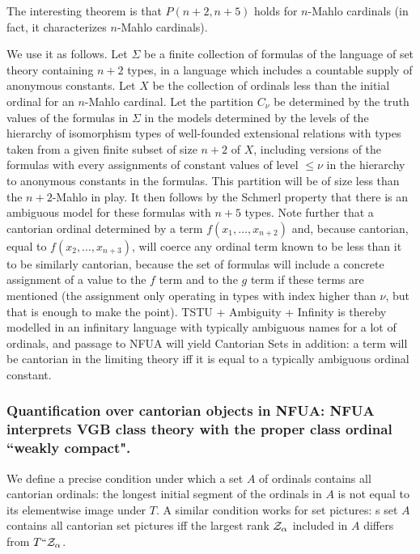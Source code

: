 \documentclass[12pt]{article}
\begin{document}
The interesting theorem is that $P(n+2,n+5)$ holds for $n$-Mahlo cardinals (in fact, it characterizes $n$-Mahlo cardinals).

We use it as follows.  Let $\Sigma$ be a finite collection of formulas of the language of set theory containing $n+2$ types, in a language which includes a countable supply of anonymous constants.  Let $X$ be the collection of ordinals less than the initial ordinal
for an $n$-Mahlo cardinal.  Let the partition $C_\nu$ be determined by the truth values of the formulas in $\Sigma$  in the models determined by the levels of the hierarchy of isomorphism types of well-founded extensional relations
with types taken from a given finite subset of size $n+2$ of $X$, including  versions of the formulas with every assignments of  constant values of level $\leq \nu$ in the hierarchy to anonymous constants in the formulas. This partition will be of size less than the $n+2$-Mahlo in play.  It then follows by the
Schmerl property that there is an ambiguous model for these formulas with $n+5$ types.  Note further that a cantorian ordinal determined by a term $f(x_1,\ldots,x_{n+2})$ and, because cantorian, equal to $f(x_2,\ldots,x_{n+3})$, will coerce any
ordinal term known to be less than it to be similarly cantorian, because the set of formulas will  include a concrete assignment of a value to the $f$ term and to the $g$ term if these terms are mentioned (the assignment only operating in types with index higher than $\nu$, but that is enough to make the point).  TSTU + Ambiguity + Infinity  is thereby modelled in an infinitary language with typically ambiguous names for a lot of ordinals, and passage to NFUA will yield Cantorian Sets in addition:  a term will be cantorian in the limiting theory iff it is equal to a typically ambiguous ordinal constant.

\subsubsection{Quantification over cantorian objects in NFUA:  NFUA interprets VGB class theory with the proper class ordinal ``weakly compact".}

We define a precise condition under which a set $A$ of ordinals contains all cantorian ordinals:  the longest initial segment of the ordinals in $A$ is not equal to its elementwise image under $T$.  A similar condition works for set pictures:  s set $A$ contains all cantorian set pictures iff the largest rank ${\cal Z}_\alpha$ included in $A$ differs from $T``{\cal Z}_\alpha$.
\end{document}
